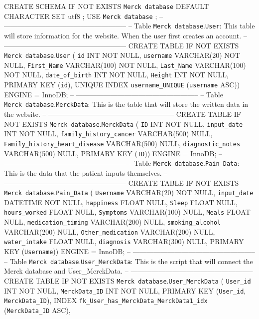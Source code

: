 \documentclass[]{book}
\begin{document}
CREATE SCHEMA IF NOT EXISTS \texttt{Merck\ database} DEFAULT CHARACTER SET utf8 ;
USE \texttt{Merck\ database} ;
-- -----------------------------------------------------
-- Table \texttt{Merck\ database}.\texttt{User}: This table will store information for the website. When the user first creates an account.
-- -----------------------------------------------------
CREATE TABLE IF NOT EXISTS \texttt{Merck\ database}.\texttt{User} (
\texttt{id} INT NOT NULL,
\texttt{username} VARCHAR(20) NOT NULL,
\texttt{First\_Name} VARCHAR(100) NOT NULL,
\texttt{Last\_Name} VARCHAR(100) NOT NULL,
\texttt{date\_of\_birth} INT NOT NULL,
\texttt{Height} INT NOT NULL,
PRIMARY KEY (\texttt{id}),
UNIQUE INDEX \texttt{username\_UNIQUE} (\texttt{username} ASC))
ENGINE = InnoDB;
-- -----------------------------------------------------
-- Table \texttt{Merck\ database}.\texttt{MerckData}: This is the table that will store the written data in the website.
-- ------------------------------------------------------
CREATE TABLE IF NOT EXISTS \texttt{Merck\ database}.\texttt{MerckData} (
\texttt{ID} INT NOT NULL,
\texttt{input\_date} INT NOT NULL,
\texttt{family\_history\_cancer} VARCHAR(500) NULL,
\texttt{Family\_history\_heart\_disease} VARCHAR(500) NULL,
\texttt{diagnostic\_notes} VARCHAR(500) NULL,
PRIMARY KEY (\texttt{ID}))
ENGINE = InnoDB;
-- -----------------------------------------------------
-- Table \texttt{Merck\ database}.\texttt{Pain\_Data}: This is the data that the patient inputs themselves.
-- -----------------------------------------------------
CREATE TABLE IF NOT EXISTS \texttt{Merck\ database}.\texttt{Pain\_Data} (
\texttt{Username} VARCHAR(20) NOT NULL,
\texttt{input\_date} DATETIME NOT NULL,
\texttt{happiness} FLOAT NULL,
\texttt{Sleep} FLOAT NULL,
\texttt{hours\_worked} FLOAT NULL,
\texttt{Symptoms} VARCHAR(100) NULL,
\texttt{Meals} FLOAT NULL,
\texttt{medication\_timing} VARCHAR(200) NULL,
\texttt{smoking\_alcohol} VARCHAR(200) NULL,
\texttt{Other\_medication} VARCHAR(200) NULL,
\texttt{water\_intake} FLOAT NULL,
\texttt{diagnosis} VARCHAR(300) NULL,
PRIMARY KEY (\texttt{Username}))
ENGINE = InnoDB;
-- -----------------------------------------------------
-- Table \texttt{Merck\ database}.\texttt{User\_MerckData}: This is the script that will connect the Merck database and User\_MerckData.
-- -----------------------------------------------------
CREATE TABLE IF NOT EXISTS \texttt{Merck\ database}.\texttt{User\_MerckData} (
\texttt{User\_id} INT NOT NULL,
\texttt{MerckData\_ID} INT NOT NULL,
PRIMARY KEY (\texttt{User\_id}, \texttt{MerckData\_ID}),
INDEX \texttt{fk\_User\_has\_MerckData\_MerckData1\_idx} (\texttt{MerckData\_ID} ASC),
\end{document}
